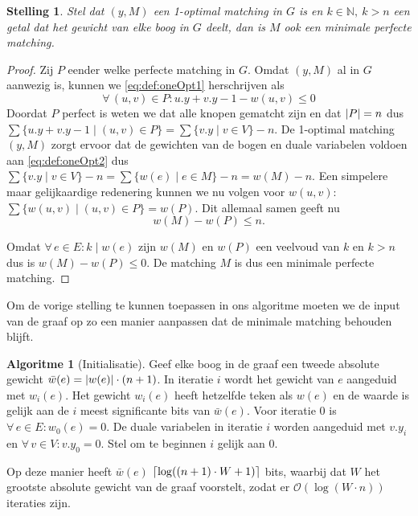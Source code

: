 \documentclass[conference]{IEEEtran}
\newtheorem{theorem}{Stelling}[section]
\theoremstyle{definition}
\newtheorem{algorithmm}{Algoritme}[section]
\DeclarePairedDelimiter{\ceil}{\lceil}{\rceil}
\DeclarePairedDelimiter{\abs}{\vert}{\vert}  %
\DeclarePairedDelimiter{\card}{\vert}{\vert}  %
\let \oldforall \forall
\renewcommand{\forall}{\oldforall\,}
\begin{document}
\begin{theorem}
    Stel dat $(y, M)$ een 1-optimal matching in $G$ is en $k \in \mathbb{N},\ k > n$ een getal dat het gewicht van elke boog in $G$ deelt, dan is $M$ ook een minimale perfecte matching.
\end{theorem}
\begin{proof}
    Zij $P$ eender welke perfecte matching in $G$. Omdat $(y, M)$ al in $G$ aanwezig is, kunnen we \eqref{eq:def:oneOpt1} herschrijven als
    \begin{equation*}
        \forall (u, v) \in P: u.y + v.y - 1 - w(u, v) \leq 0
    \end{equation*}
    Doordat $P$ perfect is weten we dat alle knopen gematcht zijn en dat $\card{P} = n$ dus $\sum\{u.y + v.y - 1 \mid (u, v) \in P\} = \sum\{v.y \mid v \in V\} - n$. De 1-optimal matching $(y, M)$ zorgt ervoor dat de gewichten van de bogen en duale variabelen voldoen aan \eqref{eq:def:oneOpt2} dus $\sum\{v.y \mid v \in V\} - n = \sum\{w(e) \mid e \in M\} - n = w(M) - n$. Een simpelere maar gelijkaardige redenering kunnen we nu volgen voor $w(u, v)$: $\sum\{w(u, v) \mid (u, v) \in P\} = w(P)$. Dit allemaal samen geeft nu
    \begin{equation*}
        w(M) - w(P) \leq n.
    \end{equation*}
    
    Omdat $\forall e \in E: k \mid w(e)$ zijn $w(M)$ en $w(P)$ een veelvoud van $k$ en $k > n$ dus is $w(M) - w(P) \leq 0$. De matching $M$ is dus een minimale perfecte matching.
\end{proof}

Om de vorige stelling te kunnen toepassen in ons algoritme moeten we de input van de graaf op zo een manier aanpassen dat de minimale matching behouden blijft.

\begin{algorithmm}[Initialisatie]
    Geef elke boog in de graaf een tweede absolute gewicht $\bar{w}(e) = \abs{w(e)} \cdot (n+1)$. In iteratie $i$ wordt het gewicht van $e$ aangeduid met $w_i(e)$. Het gewicht $w_i(e)$ heeft hetzelfde teken als $w(e)$ en de waarde is gelijk aan de $i$ meest significante bits van $\bar{w}(e)$. Voor iteratie $0$ is $\forall e \in E: w_0(e) = 0$. De duale variabelen in iteratie $i$ worden aangeduid met $v.y_i$ en $\forall v \in V: v.y_0 = 0$. Stel om te beginnen $i$ gelijk aan $0$.
\end{algorithmm}

Op deze manier heeft $\bar{w}(e)$ $\ceil{\log((n+1) \cdot W + 1)}$ bits, waarbij dat $W$ het grootste absolute gewicht van de graaf voorstelt, zodat er $\mathcal{O}(\log(W \cdot n))$ iteraties zijn.
\end{document}

